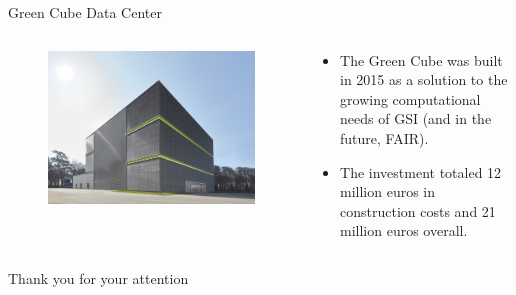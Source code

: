 \begin{frame}{Green Cube Data Center}
    \begin{columns}
        \begin{column}{0.5\textwidth}
            \begin{figure}
                \centering
                \includegraphics[width=\textwidth]{images/gsi_green_cube.jpg}
            \end{figure}
        \end{column}
        \begin{column}{0.5\textwidth}
            \begin{itemize}
                \item The Green Cube was built in 2015 as a solution to the growing computational needs of GSI (and in the future, FAIR).
                \item The investment totaled \num{12} million euros in construction costs and \num{21} million euros overall.
            \end{itemize}
        \end{column}
    \end{columns}
\end{frame}







\begin{frame}{}
    \centering
    \Large{Thank you for your attention}
\end{frame}


